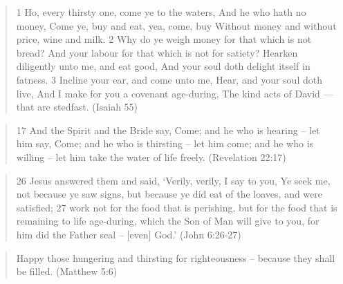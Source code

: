 \documentclass[11pt]{article}
\begin{document}
\begin{quote}
1 Ho, every thirsty one, come ye to the waters, And he who hath no money, Come ye, buy and eat, yea, come, buy Without money and without price, wine and milk.
2 Why do ye weigh money for that which is not bread? And your labour for that which is not for satiety? Hearken diligently unto me, and eat good, And your soul doth delight itself in fatness.
3 Incline your ear, and come unto me, Hear, and your soul doth live, And I make for you a covenant age-during, The kind acts of David — that are stedfast. (Isaiah 55)
\end{quote}
\begin{quote}
17 And the Spirit and the Bride say, Come; and he who is hearing -- let him say, Come; and he who is thirsting -- let him come; and he who is willing -- let him take the water of life freely. (Revelation 22:17)
\end{quote}
\begin{quote}
26 Jesus answered them and said, `Verily, verily, I say to you, Ye seek me, not because ye saw signs, but because ye did eat of the loaves, and were satisfied;
27 work not for the food that is perishing, but for the food that is remaining to life age-during, which the Son of Man will give to you, for him did the Father seal -- [even] God.' (John 6:26-27)
\end{quote}
\begin{quote}
Happy those hungering and thirsting for righteousness -- because they shall be filled.
(Matthew 5:6)
\end{quote}



\end{document}
